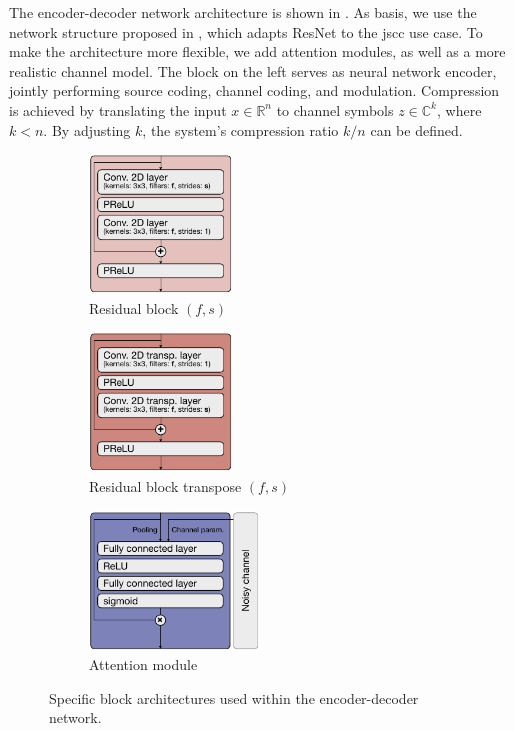 \documentclass[conference]{IEEEtran}
\begin{document}
The encoder-decoder network architecture is shown in .
As basis, we use the network structure proposed in \cite{satjscc}, which adapts ResNet \cite{resnet} to the \ac{jscc} use case.
To make the architecture more flexible, we add attention modules, as well as a more realistic channel model.
The block on the left serves as neural network encoder, jointly performing source coding, channel coding, and modulation.
Compression is achieved by translating the input $x \in \mathbb{R}^n$ to channel symbols $z \in \mathbb{C}^k$, where $k < n$.
By adjusting $k$, the system's compression ratio $k/n$ can be defined.

\begin{figure}
  \begin{subfigure}{.3\linewidth}
    \centering
    \includegraphics[height=10em]{figures/residual-block}
    \caption{Residual block $(f, s)$}
    \label{fig:residual}
  \end{subfigure}
  \hfill
  \begin{subfigure}{.3\linewidth}
    \centering
    \includegraphics[height=10em]{figures/residual-block-transpose}
    \caption{Residual block transpose $(f, s)$}
    \label{fig:residual-transpose}
  \end{subfigure}
  \hfill
  \begin{subfigure}{.3\linewidth}
    \centering
    \includegraphics[height=10em]{figures/attention-module}
    \caption{Attention module}
    \label{fig:attention}
  \end{subfigure}

  \caption{Specific block architectures used within the encoder-decoder network.}
  \label{fig:blocks}
\end{figure}
\end{document}
